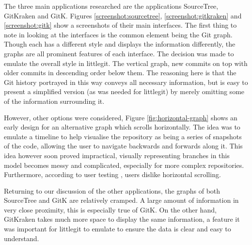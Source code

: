 The three main applications researched are the applications SourceTree, GitKraken\cite{gitkraken} and GitK. Figures \ref{screenshot:sourcetree}, \ref{screenshot:gitkraken} and \ref{screenshot:gitk} show a screenshots of their main interfaces. The first thing to note in looking at the interfaces is the common element being the Git graph. Though each has a different style and displays the information differently, the graphs are all prominent features of each interface. The decision was made to emulate the overall style in littlegit. The vertical graph, new commits on top with older commits in descending order below them. The reasoning here is that the Git history portrayed in this way conveys all necessary information, but is easy to present a simplified version (as was needed for littlegit) by merely omitting some of the information surrounding it.





However, other options were considered, Figure \ref{fig:horizontal-graph} shows an early design for an alternative graph which scrolls horizontally. The idea was to emulate a timeline to help visualise the repository as being a series of snapshots of the code, allowing the user to navigate backwards and forwards along it. This idea however soon proved impractical, visually representing branches in this model becomes messy and complicated, especially for more complex repositories. Furthermore, according to user testing \cite{horizontalScrolling}, users dislike horizontal scrolling.

Returning to our discussion of the other applications, the graphs of both SourceTree and GitK are relatively cramped. A large amount of information in very close proximity, this is especially true of GitK. On the other hand, GitKraken takes much more space to display the same information, a feature it was important for littlegit to emulate to ensure the data is clear and easy to understand.



